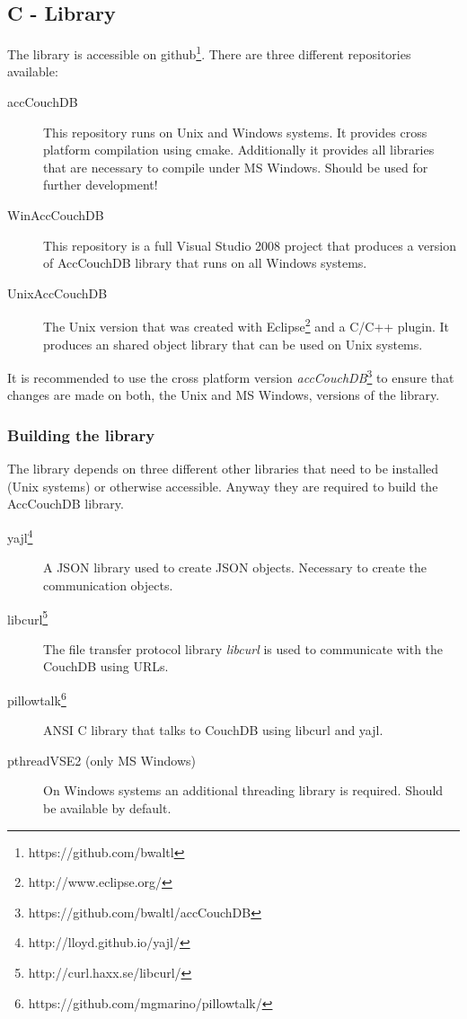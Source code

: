 \subsection{C - Library}
The library is accessible on github\footnote{https://github.com/bwaltl}. There are three different repositories available:
 \begin{description}
     \item[accCouchDB] This repository runs on Unix and Windows systems. It provides cross platform compilation using cmake. Additionally it provides all libraries that are necessary to compile under MS Windows. Should be used for further development!
     \item[WinAccCouchDB] This repository is a full Visual Studio 2008 project that produces a version of AccCouchDB library that runs on all Windows systems. 
     \item[UnixAccCouchDB] The Unix version that was created with Eclipse\footnote{http://www.eclipse.org/} and a C/C++ plugin. It produces an shared object library that can be used on Unix systems.
  \end{description}
  
It is recommended to use the cross platform version \textit{accCouchDB}\footnote{https://github.com/bwaltl/accCouchDB} to ensure that changes are made on both, the Unix and MS Windows, versions of the library.

\subsubsection{Building the library}
The library depends on three different other libraries that need to be installed (Unix systems) or otherwise accessible. Anyway they are required to build the AccCouchDB library. 

 \begin{description}
     \item[yajl\footnote{http://lloyd.github.io/yajl/}] A JSON library used to create JSON objects. Necessary to create the communication objects.
     \item[libcurl\footnote{http://curl.haxx.se/libcurl/}] The file transfer protocol library \textit{libcurl} is used to communicate with the CouchDB using URLs. 
     \item[pillowtalk\footnote{https://github.com/mgmarino/pillowtalk/}] ANSI C library that talks to CouchDB using libcurl and yajl.
     \item[pthreadVSE2 (only MS Windows)] On Windows systems an additional threading library is required. Should be available by default. 
  \end{description}
  
